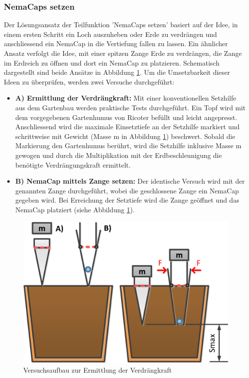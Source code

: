 \subsubsection{NemaCaps setzen}
\label{nemacaps_setzen}
Der Lösungsansatz der Teilfunktion 'NemaCaps setzen' basiert auf der Idee, in einem ersten Schritt ein Loch auszuheben oder Erde zu verdrängen und anschliessend ein NemaCap in die Vertiefung fallen zu lassen. Ein ähnlicher Ansatz verfolgt die Idee, mit einer spitzen Zange Erde zu verdrängen, die Zange im Erdreich zu öffnen und dort ein NemaCap zu platzieren. Schematisch dargestellt sind beide Ansätze in Abbildung \ref{fig:skizze_setzversuch}.
\newline
Um die Umsetzbarkeit dieser Ideen zu überprüfen, werden zwei Versuche durchgeführt:
\begin{itemize}
	\item \textbf{A) Ermittlung der Verdrängkraft:} Mit einer konventionellen Setzhilfe aus dem Gartenbau werden praktische Tests durchgeführt. Ein Topf wird mit dem vorgegebenen Gartenhumus von Ricoter befüllt und leicht angepresst. Anschliessend wird die maximale Einsetztiefe an der Setzhilfe markiert und schrittweise mit Gewicht (Masse m in Abbildung \ref{fig:skizze_setzversuch}) beschwert. Sobald die Markierung den Gartenhumus berührt, wird die Setzhilfe inklusive Masse m gewogen und durch die Multiplikation mit der Erdbeschleunigung die benötigte Verdrängungskraft ermittelt.
		
	\item \textbf{B) NemaCap mittels Zange setzen:} Der identische Versuch wird mit der genannten Zange durchgeführt, wobei die geschlossene Zange ein NemaCap gegeben wird. Bei Erreichung der Setztiefe wird die Zange geöffnet und das NemaCap platziert (siehe Abbildung \ref{fig:skizze_setzversuch}).
\end{itemize} 

\begin{figure}[H]
	\includegraphics[width=1\textwidth]{Illustrationen/5-Konzept/skizze_stechversuch.PNG}
	\caption{Versuchsaufbau zur Ermittlung der Verdrängkraft}
	\label{fig:skizze_setzversuch}
\end{figure}

